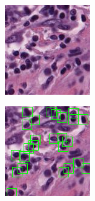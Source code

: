 \begin{figure}[H]
  \centering
  \begin{subfigure}[b]{0.32\textwidth}
    \centering
    \includegraphics[width=\linewidth]{assets/images/for_presentation/image_TCGA-EW-A1P8-01Z-00-DX1.E9852193-8CDD-49EF-B49B-DA6931198F0D_[8391, 13690, 8532, 13838].png}
    \label{fig:tiger-img}
  \end{subfigure}%
  \quad
  \begin{subfigure}[b]{0.32\textwidth}
    \centering
    \includegraphics[width=\linewidth]{assets/images/for_presentation/bbox_TCGA-EW-A1P8-01Z-00-DX1.E9852193-8CDD-49EF-B49B-DA6931198F0D_[8391, 13690, 8532, 13838].png}

\end{subfigure}
\end{figure}
